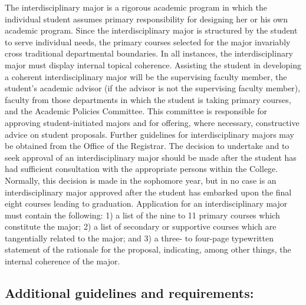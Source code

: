 \documentclass[
  letterpaper,
]{scrbook}
\begin{document}
The interdisciplinary major is a rigorous academic program in which the
individual student assumes primary responsibility for designing her or
his own academic program. Since the interdisciplinary major is
structured by the student to serve individual needs, the primary courses
selected for the major invariably cross traditional departmental
boundaries. In all instances, the interdisciplinary major must display
internal topical coherence. Assisting the student in developing a
coherent interdisciplinary major will be the supervising faculty member,
the student's academic advisor (if the advisor is not the supervising
faculty member), faculty from those departments in which the student is
taking primary courses, and the Academic Policies Committee. This
committee is responsible for approving student-initiated majors and for
offering, where necessary, constructive advice on student proposals.
Further guidelines for interdisciplinary majors may be obtained from the
Office of the Registrar. The decision to undertake and to seek approval
of an interdisciplinary major should be made after the student has had
sufficient consultation with the appropriate persons within the College.
Normally, this decision is made in the sophomore year, but in no case is
an interdisciplinary major approved after the student has embarked upon
the final eight courses leading to graduation. Application for an
interdisciplinary major must contain the following: 1) a list of the
nine to 11 primary courses which constitute the major; 2) a list of
secondary or supportive courses which are tangentially related to the
major; and 3) a three- to four-page typewritten statement of the
rationale for the proposal, indicating, among other things, the internal
coherence of the major.

\subsection{Additional guidelines and
requirements:}\label{additional-guidelines-and-requirements}
\end{document}
